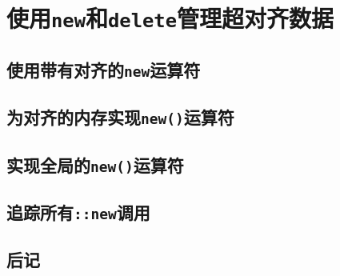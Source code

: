 \section{使用\texttt{new}和\texttt{delete}管理超对齐数据}\label{ch30}

\subsection{使用带有对齐的\texttt{new}运算符}

\subsection{为对齐的内存实现\texttt{new()}运算符}

\subsection{实现全局的\texttt{new()}运算符}

\subsection{追踪所有\texttt{::new}调用}\label{ch30.4}

\subsection{后记}